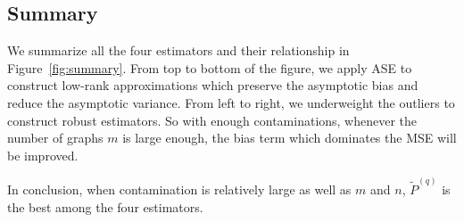 \documentclass[a4paper]{article}
\renewcommand{\hat}{\widehat}
\begin{document}
\subsection{Summary}
We summarize all the four estimators and their relationship in Figure~\ref{fig:summary}.
From top to bottom of the figure, we apply ASE to construct low-rank approximations which preserve the asymptotic bias and reduce the asymptotic variance. From left to right, we underweight the outliers to construct robust estimators. So with enough contaminations, whenever the number of graphs $m$ is large enough, the bias term which dominates the MSE will be improved.


In conclusion, when contamination is relatively large as well as $m$ and $n$, $\widetilde{P}^{(q)}$ is the best among the four estimators.

\begin{figure}
\begin{center}
\hspace*{-0.2in}
\end{center}
\end{figure}
\end{document}
